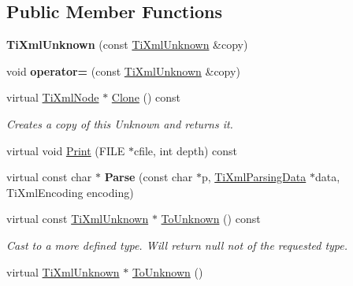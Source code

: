 \subsection*{\-Public \-Member \-Functions}
\begin{DoxyCompactItemize}
\item 
\hypertarget{classTiXmlUnknown_abe798ff4feea31474850c7f0de6bdf5e}{
{\bfseries \-Ti\-Xml\-Unknown} (const \hyperlink{classTiXmlUnknown}{\-Ti\-Xml\-Unknown} \&copy)}
\label{d5/d04/classTiXmlUnknown_abe798ff4feea31474850c7f0de6bdf5e}

\item 
\hypertarget{classTiXmlUnknown_a5097fe228cd5ad4edcdddf02c334fd83}{
void {\bfseries operator=} (const \hyperlink{classTiXmlUnknown}{\-Ti\-Xml\-Unknown} \&copy)}
\label{d5/d04/classTiXmlUnknown_a5097fe228cd5ad4edcdddf02c334fd83}

\item 
\hypertarget{classTiXmlUnknown_a675c4b2684af35e4c7649b7fd5ae598d}{
virtual \hyperlink{classTiXmlNode}{\-Ti\-Xml\-Node} $\ast$ \hyperlink{classTiXmlUnknown_a675c4b2684af35e4c7649b7fd5ae598d}{\-Clone} () const }
\label{d5/d04/classTiXmlUnknown_a675c4b2684af35e4c7649b7fd5ae598d}

\begin{DoxyCompactList}\small\item\em \-Creates a copy of this \-Unknown and returns it. \end{DoxyCompactList}\item 
virtual void \hyperlink{classTiXmlUnknown_a025f19c21ef01ea9be50febb8fe0ba06}{\-Print} (\-F\-I\-L\-E $\ast$cfile, int depth) const 
\item 
\hypertarget{classTiXmlUnknown_aa51c2694e4177b5f0b5429ee5a81b58d}{
virtual const char $\ast$ {\bfseries \-Parse} (const char $\ast$p, \hyperlink{classTiXmlParsingData}{\-Ti\-Xml\-Parsing\-Data} $\ast$data, \-Ti\-Xml\-Encoding encoding)}
\label{d5/d04/classTiXmlUnknown_aa51c2694e4177b5f0b5429ee5a81b58d}

\item 
\hypertarget{classTiXmlUnknown_ab0313e5fe77987d746ac1a97a254419d}{
virtual const \hyperlink{classTiXmlUnknown}{\-Ti\-Xml\-Unknown} $\ast$ \hyperlink{classTiXmlUnknown_ab0313e5fe77987d746ac1a97a254419d}{\-To\-Unknown} () const }
\label{d5/d04/classTiXmlUnknown_ab0313e5fe77987d746ac1a97a254419d}

\begin{DoxyCompactList}\small\item\em \-Cast to a more defined type. \-Will return null not of the requested type. \end{DoxyCompactList}\item 
\hypertarget{classTiXmlUnknown_a67c9fd22940e8c47f706a72cdd2e332c}{
virtual \hyperlink{classTiXmlUnknown}{\-Ti\-Xml\-Unknown} $\ast$ \hyperlink{classTiXmlUnknown_a67c9fd22940e8c47f706a72cdd2e332c}{\-To\-Unknown} ()}
\label{d5/d04/classTiXmlUnknown_a67c9fd22940e8c47f706a72cdd2e332c}


\end{DoxyCompactItemize}
